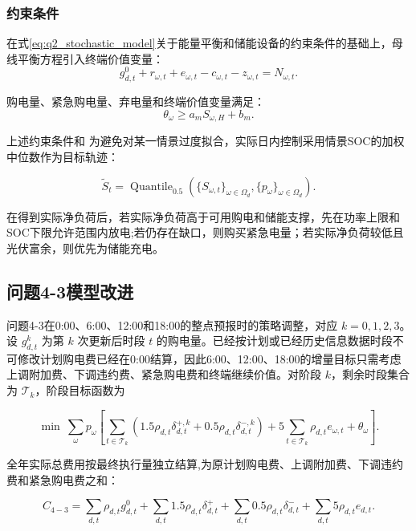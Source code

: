 \documentclass{cumcm2026}
\begin{document}
\subsubsection{约束条件}

在式\eqref{eq:q2_stochastic_model}关于能量平衡和储能设备的约束条件的基础上，母线平衡方程引入终端价值变量：
\begin{equation}
  g_{d,t}^{0}
+r_{\omega,t}
+e_{\omega,t}
-c_{\omega,t}
-z_{\omega,t}
=
N_{\omega,t}.
\end{equation}

购电量、紧急购电量、弃电量和终端价值变量满足：
\begin{equation}
 \theta_{\omega}\ge a_mS_{\omega,H}+b_m.
\end{equation}

上述约束条件和
为避免对某一情景过度拟合，实际日内控制采用情景SOC的加权中位数作为目标轨迹：

$$
\widetilde S_t
=
\operatorname{Quantile}_{0.5}
\left(
\{S_{\omega,t}\}_{\omega\in\Omega_d},
\{p_{\omega}\}_{\omega\in\Omega_d}
\right).
$$

在得到实际净负荷后，若实际净负荷高于可用购电和储能支撑，先在功率上限和SOC下限允许范围内放电;若仍存在缺口，则购买紧急电量；若实际净负荷较低且光伏富余，则优先为储能充电。

\subsection{问题4-3模型改进}

问题4-3在0:00、6:00、12:00和18:00的整点预报时的策略调整，对应 $k=0,1,2,3$。设 $g_{d,t}^{k}$ 为第 $k$ 次更新后时段 $t$ 的购电量。已经按计划或已经历史信息数据时段不可修改计划购电费已经在0:00结算，因此6:00、12:00、18:00的增量目标只需考虑上调附加费、下调违约费、紧急购电费和终端继续价值。对阶段 $k$，剩余时段集合为 $\mathcal T_k$，阶段目标函数为

\begin{equation}
  \min\
\sum_{\omega}p_{\omega}
\left[
\sum_{t\in\mathcal T_k}
\left(
1.5\rho_{d,t}\delta_{d,t}^{+,k}
+0.5\rho_{d,t}\delta_{d,t}^{-,k}
\right)
+5\sum_{t\in\mathcal T_k}\rho_{d,t}e_{\omega,t}
+\theta_{\omega}
\right].
\end{equation}

全年实际总费用按最终执行量独立结算,为原计划购电费、上调附加费、下调违约费和紧急购电费之和：

\begin{equation}
  C_{4-3}
=
\sum_{d,t}\rho_{d,t}g_{d,t}^{0}
+\sum_{d,t}1.5\rho_{d,t}\delta_{d,t}^{+}
+\sum_{d,t}0.5\rho_{d,t}\delta_{d,t}^{-}
+\sum_{d,t}5\rho_{d,t}e_{d,t}.
\end{equation}
\end{document}
